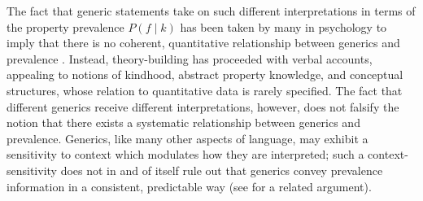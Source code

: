 \documentclass[floatsintext,man]{apa6}
\begin{document}
The fact that generic statements take on such different interpretations in terms of the property prevalence $P(f \mid k)$ has been taken by many in psychology to imply that there is no coherent, quantitative relationship between generics and prevalence \cite{Leslie2008, Cimpian2010, Khemlani2012, Prasada2013}. 
Instead, theory-building has proceeded with verbal accounts, appealing to notions of kindhood, abstract property knowledge, and conceptual structures, whose relation to quantitative data is rarely specified.
The fact that different generics receive different interpretations, however, does not falsify the notion that there exists a systematic relationship between generics and prevalence.
Generics, like many other aspects of language, may exhibit a sensitivity to context  which  modulates how they are interpreted; such a context-sensitivity does not in and of itself rule out that generics convey prevalence information in a consistent, predictable way (see  for a related argument). 

\end{document}
